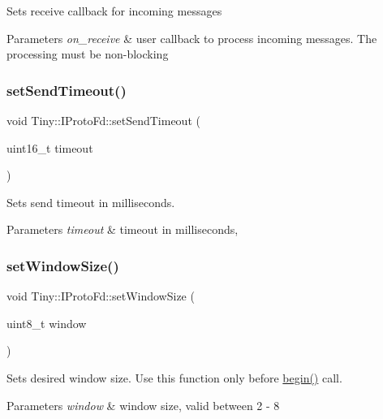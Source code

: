 Sets receive callback for incoming messages 
\begin{DoxyParams}{Parameters}
{\em on\+\_\+receive} & user callback to process incoming messages. The processing must be non-\/blocking \\
\hline
\end{DoxyParams}
\mbox{\label{classTiny_1_1IProtoFd_a2492655abda41d5b0fbda6f0e1c6badc}} 
\subsubsection{\texorpdfstring{set\+Send\+Timeout()}{setSendTimeout()}}
{\footnotesize\ttfamily void Tiny\+::\+I\+Proto\+Fd\+::set\+Send\+Timeout (\begin{DoxyParamCaption}\item[{uint16\+\_\+t}]{timeout }\end{DoxyParamCaption})\hspace{0.3cm}{\ttfamily [inline]}}

Sets send timeout in milliseconds. 
\begin{DoxyParams}{Parameters}
{\em timeout} & timeout in milliseconds, \\
\hline
\end{DoxyParams}
\mbox{\label{classTiny_1_1IProtoFd_adddcc24bf1ef40d39c944679a97c1ec4}} 
\subsubsection{\texorpdfstring{set\+Window\+Size()}{setWindowSize()}}
{\footnotesize\ttfamily void Tiny\+::\+I\+Proto\+Fd\+::set\+Window\+Size (\begin{DoxyParamCaption}\item[{uint8\+\_\+t}]{window }\end{DoxyParamCaption})\hspace{0.3cm}{\ttfamily [inline]}}

Sets desired window size. Use this function only before \hyperlink{classTiny_1_1IProtoFd_aae4e613316866105c130d613ecb25dd4}{begin()} call. 
\begin{DoxyParams}{Parameters}
{\em window} & window size, valid between 2 -\/ 8 \\
\hline
\end{DoxyParams}
\mbox{\label{classTiny_1_1IProtoFd_adea59df6702e16fd986a91c7ee62012a}} 
